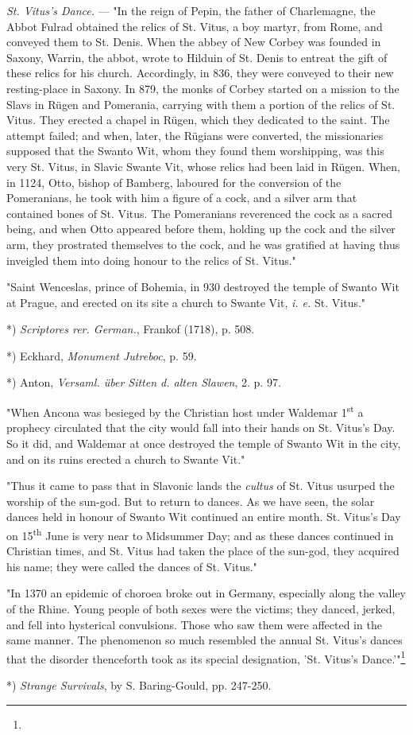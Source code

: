 \documentclass[a4paper, 11pt, oneside, polutonikogreek, english]{article}
\begin{document}
\emph{St. Vitus's Dance.} --- "In the reign of Pepin, the father of Charlemagne, the Abbot Fulrad obtained the relics of St. Vitus, a boy martyr, from Rome, and conveyed them to St. Denis. When the abbey of New Corbey was founded in Saxony, Warrin, the abbot, wrote to Hilduin of St. Denis to entreat the gift of these relics for his church. Accordingly, in 836, they were conveyed to their new resting-place in Saxony. In 879, the monks of Corbey started on a mission to the Slavs in Rügen and Pomerania, carrying with them a portion of the relics of St. Vitus. They erected a chapel in Rügen, which they dedicated to the saint. The attempt failed; and when, later, the Rügians were converted, the missionaries supposed that the Swanto Wit, whom they found them worshipping, was this very St. Vitus, in Slavic Swante Vit, whose relics had been laid in Rügen. When, in 1124, Otto, bishop of Bamberg, laboured for the conversion of the Pomeranians, he took with him a figure of a cock, and a silver arm that contained bones of St. Vitus. The Pomeranians reverenced the cock as a sacred being, and when Otto appeared before them, holding up the cock and the silver arm, they prostrated themselves to the cock, and he was gratified at having thus inveigled them into doing honour to the relics of St. Vitus."

"Saint Wenceslas, prince of Bohemia, in 930 destroyed the temple of Swanto Wit at Prague, and erected on its site a church to Swante Vit, \emph{i. e.} St. Vitus."

*) \emph{Scriptores rer. German.}, Frankof (1718), p. 508.

*) Eckhard, \emph{Monument Jutreboc}, p. 59.

*) Anton, \emph{Versaml. über Sitten d. alten Slawen}, 2. p. 97. 

"When Ancona was besieged by the Christian host under Waldemar 1\textsuperscript{st} a prophecy circulated that the city would fall into their hands on St. Vitus's Day. So it did, and Waldemar at once destroyed the temple of Swanto Wit in the city, and on its ruins erected a church to Swante Vit."

"Thus it came to pass that in Slavonic lands the \emph{cultus} of St. Vitus usurped the worship of the sun-god. But to return to dances. As we have seen, the solar dances held in honour of Swanto Wit continued an entire month. St. Vitus's Day on 15\textsuperscript{th} June is very near to Midsummer Day; and as these dances continued in Christian times, and St. Vitus had taken the place of the sun-god, they acquired his name; they were called the dances of St. Vitus."

"In 1370 an epidemic of choroea broke out in Germany, especially along the valley of the Rhine. Young people of both sexes were the victims; they danced, jerked, and fell into hysterical convulsions. Those who saw them were affected in the same manner. The phenomenon so much resembled the annual St. Vitus's dances that the disorder thenceforth took as its special designation, 'St. Vitus's Dance.'"\footnote{}

*) \emph{Strange Survivals}, by S. Baring-Gould, pp. 247-250.
\end{document}
